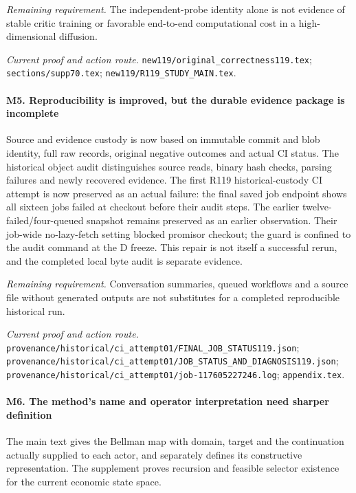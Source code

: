 \par\emph{Remaining requirement.} The independent-probe identity alone is not evidence of stable critic training or favorable end-to-end computational cost in a high-dimensional diffusion.

\par\emph{Current proof and action route.} \nolinkurl{new119/original_correctness119.tex}; \nolinkurl{sections/supp70.tex}; \nolinkurl{new119/R119_STUDY_MAIN.tex}.

\paragraph{M5. Reproducibility is improved, but the durable evidence package is incomplete}

Source and evidence custody is now based on immutable commit and blob identity, full raw records, original negative outcomes and actual CI status. The historical object audit distinguishes source reads, binary hash checks, parsing failures and newly recovered evidence. The first R119 historical-custody CI attempt is now preserved as an actual failure: the final saved job endpoint shows all sixteen jobs failed at checkout before their audit steps. The earlier twelve-failed/\allowbreak{}four-queued snapshot remains preserved as an earlier observation. Their job-wide no-lazy-fetch setting blocked promisor checkout; the guard is confined to the audit command at the D freeze. This repair is not itself a successful rerun, and the completed local byte audit is separate evidence.

\par\emph{Remaining requirement.} Conversation summaries, queued workflows and a source file without generated outputs are not substitutes for a completed reproducible historical run.

\par\emph{Current proof and action route.} \nolinkurl{provenance/historical/ci_attempt01/FINAL_JOB_STATUS119.json}; \nolinkurl{provenance/historical/ci_attempt01/JOB_STATUS_AND_DIAGNOSIS119.json}; \nolinkurl{provenance/historical/ci_attempt01/job-117605227246.log}; \nolinkurl{appendix.tex}.

\paragraph{M6. The method's name and operator interpretation need sharper definition}

The main text gives the Bellman map with domain, target and the continuation actually supplied to each actor, and separately defines its constructive representation. The supplement proves recursion and feasible selector existence for the current economic state space.

